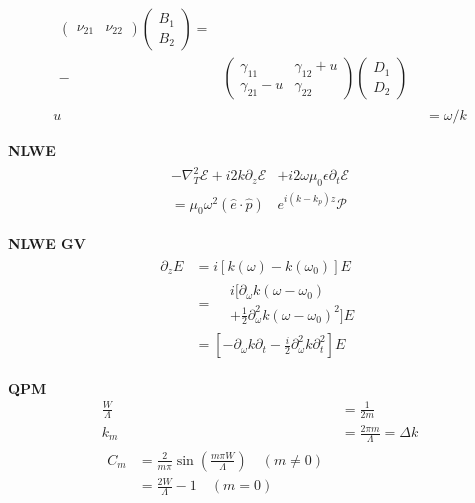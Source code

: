 \documentclass[12pt]{article}
\begin{document}
\begin{multicols}{3}
\begin{align}
\begin{split}
\begin{pmatrix}
    \nu_{21} & \nu_{22}
  \end{pmatrix}
  {}\begin{pmatrix}
    B_1\\
    B_2
  \end{pmatrix} =\\
  -&\begin{pmatrix}
    \gamma_{11} & \gamma_{12} + u\\
    \gamma_{21} - u & \gamma_{22}
  \end{pmatrix}
  \begin{pmatrix}
      D_1\\
      D_2
  \end{pmatrix}
  \end{split}\\
  u &= \omega / k
\end{align}

\textbf{NLWE}
\begin{align}
  \begin{split}
    -\nabla_T^2 \mathcal{E} + i2k\partial_z\mathcal{E}
    &+ i2\omega\mu_0\epsilon \partial_t \mathcal{E}\\
    = \mu_0\omega^2(\hat{e} \cdot \hat{p})&e^{i(k-k_p)z}\mathcal{P}
  \end{split}
\end{align}

\textbf{NLWE GV}
\begin{align}
\begin{split}
  \partial_z E &= i[k(\omega) - k(\omega_0)] E\\
  &= \begin{aligned}
    &i[\partial_{\omega} k (\omega - \omega_0)\\
      &+ \frac{1}{2}\partial_{\omega}^2 k (\omega - \omega_0)^2] E
  \end{aligned}\\
  &= [-\partial_{\omega} k \partial_t - \frac{i}{2}\partial_{\omega}^2 k \partial^2_t] E
\end{split}
\end{align}

\textbf{QPM}
\begin{align}
  \frac{W}{\Lambda} &= \frac{1}{2m}\\
  k_{m} &= \frac{2\pi m}{\Lambda} = \Delta k\\
  \begin{split}
    C_m &= \frac{2}{m\pi}\sin(\frac{m\pi W}{\Lambda}) \quad (m \neq 0)\\
    &= \frac{2W}{\Lambda} - 1 \quad (m = 0)
  \end{split}
\end{align}


\end{multicols}
\end{document}
